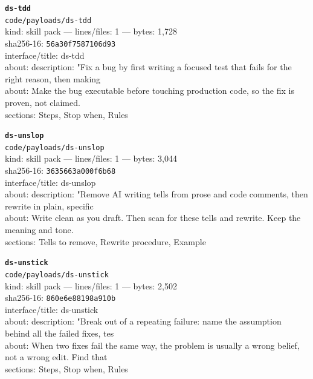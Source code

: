 \noindent\textbf{\texttt{ds-tdd}}\\
\texttt{code/payloads/ds-tdd}\\
kind: skill pack --- lines/files: 1 --- bytes: 1,728\\
sha256-16: \texttt{56a30f7587106d93}\\
interface/title: ds-tdd\\
about: description: "Fix a bug by first writing a focused test that fails for the right reason, then making\\
about: Make the bug executable before touching production code, so the fix is proven, not claimed.\\
sections: Steps, Stop when, Rules\\
\vspace*{6.0pt}

\noindent\textbf{\texttt{ds-unslop}}\\
\texttt{code/payloads/ds-unslop}\\
kind: skill pack --- lines/files: 1 --- bytes: 3,044\\
sha256-16: \texttt{3635663a000f6b68}\\
interface/title: ds-unslop\\
about: description: "Remove AI writing tells from prose and code comments, then rewrite in plain, specific \\
about: Write clean as you draft. Then scan for these tells and rewrite. Keep the meaning and tone.\\
sections: Tells to remove, Rewrite procedure, Example\\
\vspace*{6.0pt}
\newpage

\noindent\textbf{\texttt{ds-unstick}}\\
\texttt{code/payloads/ds-unstick}\\
kind: skill pack --- lines/files: 1 --- bytes: 2,502\\
sha256-16: \texttt{860e6e88198a910b}\\
interface/title: ds-unstick\\
about: description: "Break out of a repeating failure: name the assumption behind all the failed fixes, tes\\
about: When two fixes fail the same way, the problem is usually a wrong belief, not a wrong edit. Find that\\
sections: Steps, Stop when, Rules\\
\vspace*{6.0pt}

